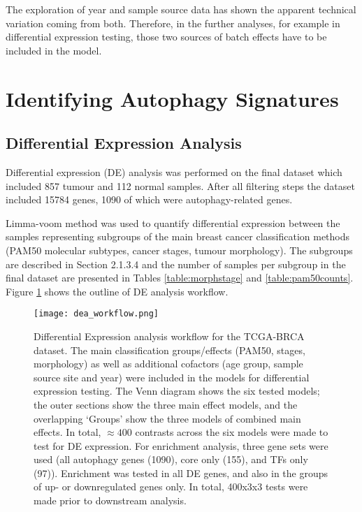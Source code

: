     The exploration of year and sample source data has shown the apparent technical variation coming from both. Therefore, in the further analyses, for example in differential expression testing, those two sources of batch effects have to be included in the model. 


\newpage
\section{Identifying Autophagy Signatures}

    \subsection{Differential Expression Analysis}
    
    Differential expression (DE) analysis was performed on the final dataset which included 857 tumour and 112 normal samples. After all filtering steps the dataset included 15784 genes, 1090 of which were autophagy-related genes. 

    Limma-voom method was used to quantify differential expression between the samples representing subgroups of the main breast cancer classification methods (PAM50 molecular subtypes, cancer stages, tumour morphology). The subgroups are described in Section 2.1.3.4 and the number of samples per subgroup in the final dataset are presented in Tables \ref{table:morphstage} and \ref{table:pam50counts}. Figure \ref{fig:deaworkflow} shows the outline of DE analysis workflow. 

       
            \begin{figure}[!h]
            \centering
            \texttt{[image: dea\_workflow.png]} 
            \caption[Differential Expression Analysis workflow]{Differential Expression analysis workflow for the TCGA-BRCA dataset. The main classification groups/effects (PAM50, stages, morphology) as well as additional cofactors (age group, sample source site and year) were included in the models for differential expression testing. The Venn diagram shows the six tested models; the outer sections show the three main effect models, and the overlapping ‘Groups' show the three models of combined main effects. In total, $\approx 400$ contrasts across the six models were made to test for DE expression. For enrichment analysis, three gene sets were used (all autophagy genes (1090), core only (155), and TFs only (97)). Enrichment was tested in all DE genes, and also in the groups of up- or downregulated genes only. In total, 400x3x3 tests were made prior to downstream analysis.  }
            \label{fig:deaworkflow}
            \end{figure}

